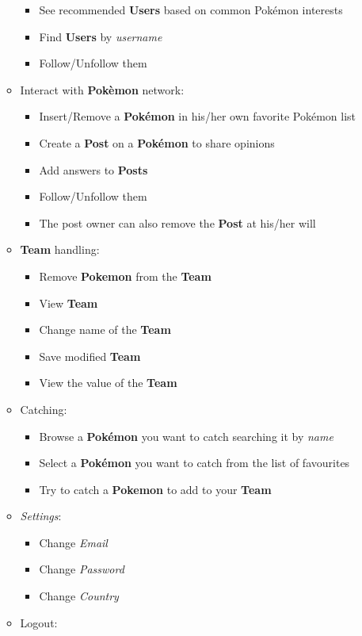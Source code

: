 \begin{itemize}
\begin{itemize}
\begin{itemize}
			\item See recommended \textbf{Users} based on common Pokémon interests
			\item Find \textbf{Users} by \textit{username}
			\item Follow/Unfollow them
		\end{itemize}
		\item Interact with \textbf{Pokèmon} network:
		\begin{itemize}
			\item Insert/Remove a \textbf{Pokémon} in his/her own favorite Pokémon list
			\item Create a \textbf{Post} on a \textbf{Pokémon} to share opinions
			\item Add answers to \textbf{Posts}
			\item Follow/Unfollow them
			\item The post owner can also remove the \textbf{Post} at his/her will
		\end{itemize}
		\item \textbf{Team} handling:
		\begin{itemize}
			\item Remove \textbf{Pokemon} from the \textbf{Team}
			\item View \textbf{Team}
			\item Change name of the \textbf{Team}	
			\item Save modified \textbf{Team}
			\item View the value of the \textbf{Team}
		\end{itemize}
		\item Catching:
		\begin{itemize}
			\item Browse a \textbf{Pokémon} you want to catch searching it by \textit{name} 
			\item Select a \textbf{Pokémon} you want to catch from the list of favourites
			\item Try to catch a \textbf{Pokemon} to add to your \textbf{Team}
		\end{itemize}
		\item \textit{Settings}:
		\begin{itemize}
			\item Change \textit{Email}
			\item Change \textit{Password}
			\item Change \textit{Country}
		\end{itemize}
		\item Logout:

\end{itemize}
\end{itemize}
